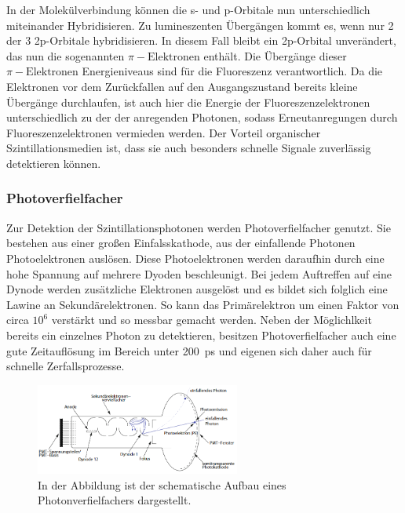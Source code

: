                 In der Molekülverbindung können die s- und p-Orbitale nun unterschiedlich miteinander Hybridisieren. Zu lumineszenten Übergängen kommt es, wenn nur 2 der 3 2p-Orbitale hybridisieren. In diesem
                Fall bleibt ein 2p-Orbital unverändert, das nun die sogenannten $\pi-\text{Elektronen}$ enthält. Die Übergänge dieser $\pi-\text{Elektronen}$ Energieniveaus sind für die Fluoreszenz verantwortlich.
                Da die Elektronen vor dem Zurückfallen auf den Ausgangszustand bereits kleine Übergänge durchlaufen, ist auch hier die Energie der Fluoreszenzelektronen unterschiedlich zu der der anregenden
                Photonen, sodass Erneutanregungen durch Fluoreszenzelektronen vermieden werden. Der Vorteil organischer Szintillationsmedien ist, dass sie auch besonders schnelle Signale zuverlässig 
                detektieren können.

            \subsubsection*{Photoverfielfacher}
                Zur Detektion der Szintillationsphotonen werden Photoverfielfacher genutzt. Sie bestehen aus einer großen Einfalsskathode, aus der einfallende Photonen Photoelektronen auslösen. Diese
                Photoelektronen werden daraufhin durch eine hohe Spannung auf mehrere Dyoden beschleunigt. Bei jedem Auftreffen auf eine Dynode werden zusätzliche Elektronen ausgelöst und es bildet sich 
                folglich eine Lawine an Sekundärelektronen. So kann das Primärelektron um einen Faktor von circa $10^6$ verstärkt und so messbar gemacht werden. Neben der Möglichlkeit bereits ein einzelnes 
                Photon zu detektieren, besitzen Photoverfielfacher auch eine gute Zeitauflösung im  Bereich unter \SI{200}{\pico\second} und eigenen sich daher auch für schnelle Zerfallsprozesse.

                \FloatBarrier

                \begin{figure}[h]
                  \centering
                  \includegraphics[width = 0.6\textwidth]{pictures/photomultiplier.png}
                  \caption{In der Abbildung ist der schematische Aufbau eines Photonverfielfachers dargestellt.}
                  \label{fig:photomultiplier}
                \end{figure}
        
                \FloatBarrier
        
                \noindent

